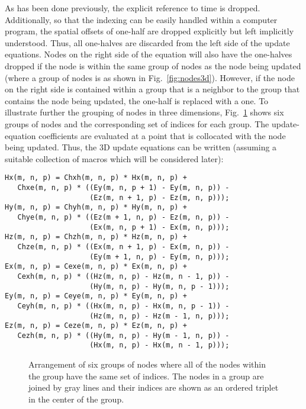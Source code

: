 As has been done previously, the explicit reference to time is
dropped.  Additionally, so that the indexing can be easily handled
within a computer program, the spatial offsets of one-half are dropped
explicitly but left implicitly understood.  Thus, all one-halves are
discarded from the left side of the update equations.  Nodes on the
right side of the equation will also have the one-halves dropped if
the node is within the same group of nodes as the node being updated
(where a group of nodes is as shown in Fig.\
\ref{fig:nodes3d}).  However, if the node on the right side is
contained within a group that is a neighbor to the group that contains
the node being updated, the one-half is replaced with a one.  To
illustrate further the grouping of nodes in three dimensions, Fig.\
\ref{fig:3dComputer} shows six groups of nodes and the corresponding
set of indices for each group.  The update-equation coefficients are
evaluated at a point that is collocated with the node being updated.
Thus, the 3D update equations can be written (assuming a suitable
collection of macros which will be considered later):
\begin{verbatim}
Hx(m, n, p) = Chxh(m, n, p) * Hx(m, n, p) +
   Chxe(m, n, p) * ((Ey(m, n, p + 1) - Ey(m, n, p)) -
                    (Ez(m, n + 1, p) - Ez(m, n, p)));
Hy(m, n, p) = Chyh(m, n, p) * Hy(m, n, p) +
   Chye(m, n, p) * ((Ez(m + 1, n, p) - Ez(m, n, p)) -
                    (Ex(m, n, p + 1) - Ex(m, n, p)));
Hz(m, n, p) = Chzh(m, n, p) * Hz(m, n, p) +
   Chze(m, n, p) * ((Ex(m, n + 1, p) - Ex(m, n, p)) -
                    (Ey(m + 1, n, p) - Ey(m, n, p)));
Ex(m, n, p) = Cexe(m, n, p) * Ex(m, n, p) +
   Cexh(m, n, p) * ((Hz(m, n, p) - Hz(m, n - 1, p)) -
                    (Hy(m, n, p) - Hy(m, n, p - 1)));
Ey(m, n, p) = Ceye(m, n, p) * Ey(m, n, p) +
   Ceyh(m, n, p) * ((Hx(m, n, p) - Hx(m, n, p - 1)) -
                    (Hz(m, n, p) - Hz(m - 1, n, p)));
Ez(m, n, p) = Ceze(m, n, p) * Ez(m, n, p) + 
   Cezh(m, n, p) * ((Hy(m, n, p) - Hy(m - 1, n, p)) -
                    (Hx(m, n, p) - Hx(m, n - 1, p)));
\end{verbatim}

\begin{figure}
  \begin{center}
  \end{center}
  \caption{Arrangement of six groups of nodes where all of the nodes
  within the group have the same set of indices.  The nodes in a group
  are joined by gray lines and their indices are shown as an
  ordered triplet in the center of the group.}  \label{fig:3dComputer}
\end{figure}

